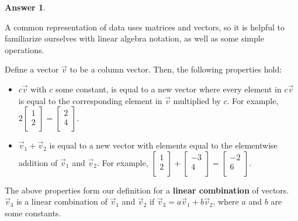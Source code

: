 \documentclass[addpoints, 12pt]{exam}
\theoremstyle{definition}
\newtheorem*{answer}{Answer}
\begin{document}
\begin{questions}
\begin{shaded}
\begin{answer}
\end{answer}
\end{shaded}

\newpage


\question[6] A common representation of data uses matrices and vectors, so it is helpful to familiarize ourselves with linear algebra notation, as well as some simple operations.

Define a vector $\vec{v}$ to be a column vector. Then, the following properties hold:

\begin{itemize}
    \item $c\vec{v}$ with $c$ some constant, is equal to a new vector where every element in $c\vec{v}$ is equal to the corresponding element in $\vec{v}$ multiplied by $c$. For example, $2 \begin{bmatrix}
     1 \\
     2 \\
\end{bmatrix} = \begin{bmatrix}
     2 \\
     4 \\
\end{bmatrix}$.
    \item $\vec{v}_1 + \vec{v}_2$ is equal to a new vector with elements equal to the elementwise addition of $\vec{v}_1$ and $\vec{v}_2$. For example, $\begin{bmatrix}
     1 \\
     2 \\
\end{bmatrix} + \begin{bmatrix}
     -3 \\
     4 \\
\end{bmatrix} = \begin{bmatrix}
    -2 \\
     6 \\
\end{bmatrix}$.
\end{itemize}

The above properties form our definition for a \textbf{linear combination} of vectors. $\vec{v}_3$ is a linear combination of $\vec{v}_1$ and $\vec{v}_2$ if $\vec{v}_3 = a\vec{v}_1 + b\vec{v}_2$, where $a$ and $b$ are some constants.


\end{questions}
\end{document}
